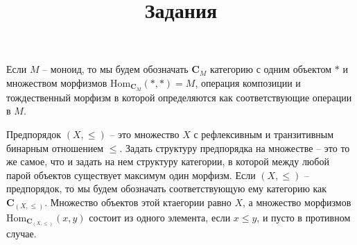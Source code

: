 \documentclass[draft]{article}
\newcommand{\cat}[1]{\mathbf{#1}}
\renewcommand{\C}{\cat{C}}
\newcommand{\fs}[1]{\mathrm{#1}}
\newcommand{\Hom}{\fs{Hom}}
\begin{document}
\title{Задания}
\maketitle

Если $M$ -- моноид, то мы будем обозначать $\C_M$ категорию с одним объектом $*$ и множеством морфизмов $\Hom_{\C_M}(*, *) = M$, операция композиции и тождественный морфизм в которой определяются как соответствующие операции в $M$.

Предпорядок $(X,\leq)$ -- это множество $X$ с рефлексивным и транзитивным бинарным отношением $\leq$.
Задать структуру предпорядка на множестве -- это то же самое, что и задать на нем структуру категории, в которой между любой парой объектов существует максимум один морфизм.
Если $(X,\leq)$ -- предпорядок, то мы будем обозначать соответствующую ему категорию как $\C_{(X,\leq)}$.
Множество объектов этой ктаегории равно $X$, а множество морфизмов $\Hom_{\C_{(X,\leq)}}(x, y)$ состоит из одного элемента, если $x \leq y$, и пусто в противном случае.
\end{document}
